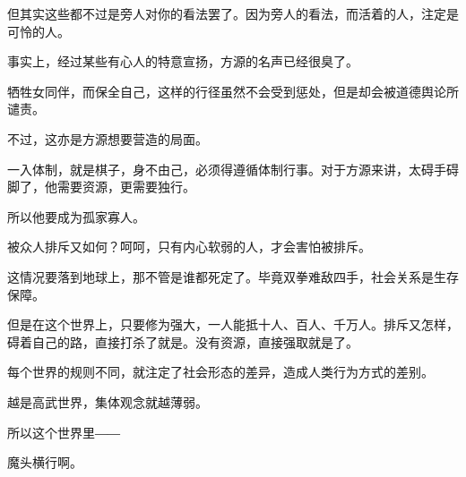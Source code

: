 \begin{this_body}
但其实这些都不过是旁人对你的看法罢了。因为旁人的看法，而活着的人，注定是可怜的人。

事实上，经过某些有心人的特意宣扬，方源的名声已经很臭了。

牺牲女同伴，而保全自己，这样的行径虽然不会受到惩处，但是却会被道德舆论所谴责。

不过，这亦是方源想要营造的局面。

一入体制，就是棋子，身不由己，必须得遵循体制行事。对于方源来讲，太碍手碍脚了，他需要资源，更需要独行。

所以他要成为孤家寡人。

被众人排斥又如何？呵呵，只有内心软弱的人，才会害怕被排斥。

这情况要落到地球上，那不管是谁都死定了。毕竟双拳难敌四手，社会关系是生存保障。

但是在这个世界上，只要修为强大，一人能抵十人、百人、千万人。排斥又怎样，碍着自己的路，直接打杀了就是。没有资源，直接强取就是了。

每个世界的规则不同，就注定了社会形态的差异，造成人类行为方式的差别。

越是高武世界，集体观念就越薄弱。

所以这个世界里――

魔头横行啊。

\end{this_body}

